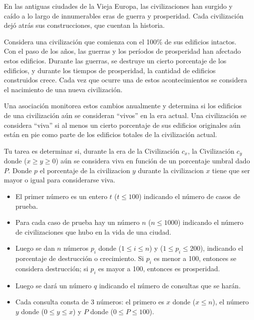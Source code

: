 
En las antiguas ciudades de la Vieja Europa, las civilizaciones han surgido y caído a lo largo de innumerables eras de guerra y prosperidad. Cada civilización dejó atrás sus construcciones, que cuentan la historia.

Considera una civilización que comienza con el 100\% de sus edificios intactos. Con el paso de los años, las guerras y los períodos de prosperidad han afectado estos edificios. Durante las guerras, se destruye un cierto porcentaje de los edificios, y durante los tiempos de prosperidad, la cantidad de edificios construidos crece. Cada vez que ocurre una de estos acontecimientos se considera el nacimiento de una nueva civilización.

Una asociación monitorea estos cambios anualmente y determina si los edificios de una civilización aún se consideran ``vivos'' en la era actual. Una civilización se considera ``viva'' si al menos un cierto porcentaje de sus edificios originales aún están en pie como parte de los edificios totales de la civilización actual.

Tu tarea es determinar si, durante la era de la Civilización $c_x$, la Civilización $c_y$ donde ($x \geq y \geq 0$) aún se considera viva en función de un porcentaje umbral dado $P$. Donde $p$ el porcentaje de la civilizacion $y$ durante la civilizacion $x$ tiene que ser mayor o igual para considerarse viva.


\begin{itemize}
    \item El primer número es un entero $t$ ($t \leq 100$) indicando el número de casos de prueba.
    \item Para cada caso de prueba hay un número $n$ ($n \leq 1000$) indicando el número de civilizaciones que hubo en la vida de una ciudad.
    \item Luego se dan $n$ números $p_i$ donde ($1 \leq i \leq n$) y ($1 \leq p_i \leq 200$), indicando el porcentaje de destrucción o crecimiento. Si $p_i$ es menor a 100, entonces se considera destrucción; si $p_i$ es mayor a 100, entonces es prosperidad.
    \item Luego se dará un número $q$ indicando el número de consultas que se harán.
    \item Cada consulta consta de 3 números: el primero es $x$ donde ($x \leq n$), el número $y$ donde ($0 \leq y \leq x$) y $P$ donde ($0 \leq P \leq 100$).
\end{itemize}


